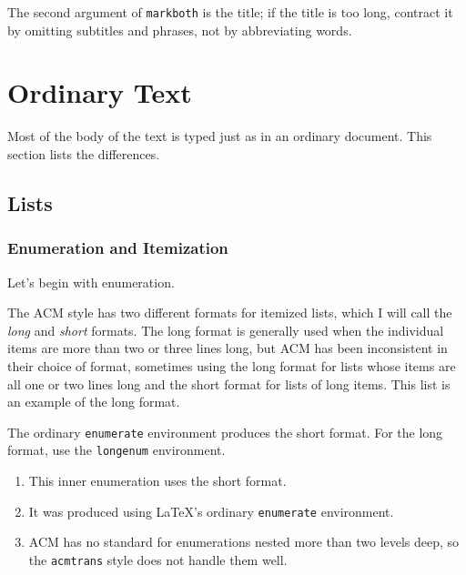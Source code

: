 \documentclass[hyperref]{acmtrans2e}
\begin{document}
The second argument of \verb|markboth| is the title;
if the title is too long, 
contract it by omitting subtitles and phrases, not by abbreviating words.


\section{Ordinary Text}

Most of the body of the text is typed just as in an ordinary
document.  This section lists the differences.

\subsection{Lists}

\subsubsection{Enumeration and Itemization}

Let's begin with enumeration.
\begin{longenum}
\item The ACM style has two different formats for 
itemized lists, which I will call the {\em long\/} and {\em short\/}
formats.  The long format is generally used when the individual items
are more than two or three lines long, but ACM has been inconsistent in
their choice of format, sometimes using the long format for lists whose
items are all one or two lines long and the short format for lists of
long items.  This list is an example of the long format.

\item The ordinary {\tt enumerate} environment
produces the short format.  For the long format, use the
{\tt longenum} environment.
\begin{enumerate}\itemindent 10pt
\item This inner enumeration uses the short format.
\item It was produced using \LaTeX's ordinary {\tt enumerate}
      environment.
\item ACM has no standard for enumerations nested more than
      two levels deep, so the {\tt acmtrans} style does not
      handle them well.
\end{enumerate}
\end{longenum}
\end{document}
